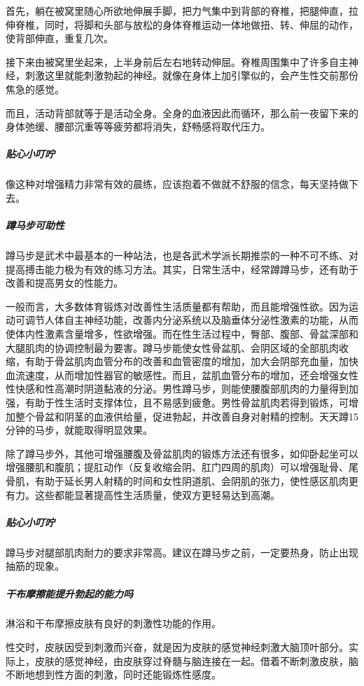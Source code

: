 首先，躺在被窝里随心所欲地伸展手脚，把力气集中到背部的脊椎，把腿伸直，拉伸脊椎，同时，将脚和头部与放松的身体脊椎运动一体地做扭、转、伸屈的动作，使背部伸直，重复几次。

接下来由被窝里坐起来，上半身前后左右地转动伸屈。脊椎周围集中了许多自主神经，刺激这里就能刺激勃起的神经。就像在身体上加引擎似的，会产生性交前那份焦急的感觉。

而且，活动背部就等于是活动全身。全身的血液因此而循环，那么前一夜留下来的身体弛缓、腰部沉重等等疲劳都将消失，舒畅感将取代压力。

\subparagraph{贴心小叮咛}

像这种对增强精力非常有效的晨练，应该抱着不做就不舒服的信念，每天坚持做下去。

\subparagraph{蹲马步可助性}

蹲马步是武术中最基本的一种站法，也是各武术学派长期推崇的一种不可不练、对提高搏击能力极为有效的练习方法。其实，日常生活中，经常蹲蹲马步，还有助于改善和提高男女的性能力。

一般而言，大多数体育锻炼对改善性生活质量都有帮助，而且能增强性欲。因为运动可调节人体自主神经功能，改善内分泌系统以及脑垂体分泌性激素的功能，从而使体内性激素含量增多，性欲增强。而在性生活过程中，臀部、腹部、骨盆深部和大腿肌肉的协调控制最为要害。蹲马步能使女性骨盆肌、会阴区域的全部肌肉收缩，有助于骨盆肌肉血管分布的改善和血管密度的增加，加大会阴部充血量，加快血流速度，从而增加性器官的敏感性。而且，盆肌血管分布的增加，还会增强女性性快感和性高潮时阴道黏液的分泌。男性蹲马步，则能使腰腹部肌肉的力量得到加强，有助于性生活时支撑体位，且不易感到疲惫。男性骨盆肌肉若得到锻炼，可增加整个骨盆和阴茎的血液供给量，促进勃起，并改善自身对射精的控制。天天蹲15分钟的马步，就能取得明显效果。

除了蹲马步外，其他可增强腰腹及骨盆肌肉的锻炼方法还有很多，如仰卧起坐可以增强腰肌和腹肌；提肛动作（反复收缩会阴、肛门四周的肌肉）可以增强耻骨、尾骨肌，有助于延长男人射精的时间和女性阴道肌、会阴肌的张力，使性感区肌肉更有力。这些都能显著提高性生活质量，使双方更轻易达到高潮。

\subparagraph{贴心小叮咛}

蹲马步对腿部肌肉耐力的要求非常高。建议在蹲马步之前，一定要热身，防止出现抽筋的现象。

\subparagraph{干布摩擦能提升勃起的能力吗}

淋浴和干布摩擦皮肤有良好的刺激性功能的作用。

性交时，皮肤因受到刺激而兴奋，就是因为皮肤的感觉神经刺激大脑顶叶部分。实际上，皮肤的感觉神经，由皮肤穿过脊髓与脑连接在一起。借着不断刺激皮肤，脑不断地想到性方面的刺激，同时还能锻炼性感度。

